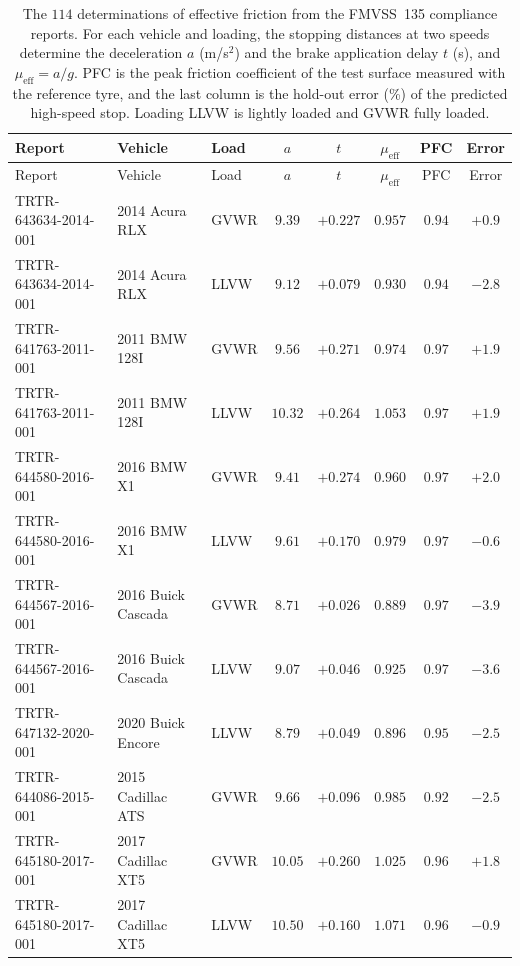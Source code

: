 {\footnotesize\setlength{\tabcolsep}{3pt}
\begin{longtable}{lp{2.9cm}lccccc}
\caption{The $114$ determinations of effective friction from the FMVSS~135 compliance reports. For each vehicle and loading, the stopping distances at two speeds determine the deceleration $a$ (m/s$^2$) and the brake application delay $t$ (s), and $\mu_{\mathrm{eff}}=a/g$. PFC is the peak friction coefficient of the test surface measured with the reference tyre, and the last column is the hold-out error (\%) of the predicted high-speed stop. Loading LLVW is lightly loaded and GVWR fully loaded.}\label{tab:fmvss}\\
\toprule
Report & Vehicle & Load & $a$ & $t$ & $\mu_{\mathrm{eff}}$ & PFC & Error\\
\midrule
\endfirsthead
\toprule
Report & Vehicle & Load & $a$ & $t$ & $\mu_{\mathrm{eff}}$ & PFC & Error\\
\midrule
\endhead
\bottomrule
\endfoot
TRTR-643634-2014-001 & 2014 Acura RLX & GVWR & $9.39$ & $+0.227$ & $0.957$ & $0.94$ & $+0.9$\\
TRTR-643634-2014-001 & 2014 Acura RLX & LLVW & $9.12$ & $+0.079$ & $0.930$ & $0.94$ & $-2.8$\\
TRTR-641763-2011-001 & 2011 BMW 128I & GVWR & $9.56$ & $+0.271$ & $0.974$ & $0.97$ & $+1.9$\\
TRTR-641763-2011-001 & 2011 BMW 128I & LLVW & $10.32$ & $+0.264$ & $1.053$ & $0.97$ & $+1.9$\\
TRTR-644580-2016-001 & 2016 BMW X1 & GVWR & $9.41$ & $+0.274$ & $0.960$ & $0.97$ & $+2.0$\\
TRTR-644580-2016-001 & 2016 BMW X1 & LLVW & $9.61$ & $+0.170$ & $0.979$ & $0.97$ & $-0.6$\\
TRTR-644567-2016-001 & 2016 Buick Cascada & GVWR & $8.71$ & $+0.026$ & $0.889$ & $0.97$ & $-3.9$\\
TRTR-644567-2016-001 & 2016 Buick Cascada & LLVW & $9.07$ & $+0.046$ & $0.925$ & $0.97$ & $-3.6$\\
TRTR-647132-2020-001 & 2020 Buick Encore & LLVW & $8.79$ & $+0.049$ & $0.896$ & $0.95$ & $-2.5$\\
TRTR-644086-2015-001 & 2015 Cadillac ATS & GVWR & $9.66$ & $+0.096$ & $0.985$ & $0.92$ & $-2.5$\\
TRTR-645180-2017-001 & 2017 Cadillac XT5 & GVWR & $10.05$ & $+0.260$ & $1.025$ & $0.96$ & $+1.8$\\
TRTR-645180-2017-001 & 2017 Cadillac XT5 & LLVW & $10.50$ & $+0.160$ & $1.071$ & $0.96$ & $-0.9$\\

\end{longtable}}

